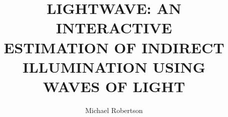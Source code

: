 \documentclass[12pt]{report}
\author{Michael Robertson}
\title{
LIGHTWAVE: AN INTERACTIVE \\
ESTIMATION OF INDIRECT \\
ILLUMINATION USING \\
WAVES OF LIGHT}
\begin{document}

\maketitle

\raggedright



\tableofcontents



\listoftables


\listoffigures

%

%


\raggedright
\startbody








%




%
%
\end{document}
